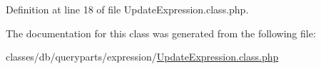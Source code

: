 Definition at line 18 of file Update\-Expression.\-class.\-php.



The documentation for this class was generated from the following file\-:\begin{DoxyCompactItemize}
\item 
classes/db/queryparts/expression/\hyperlink{UpdateExpression_8class_8php}{Update\-Expression.\-class.\-php}\end{DoxyCompactItemize}
